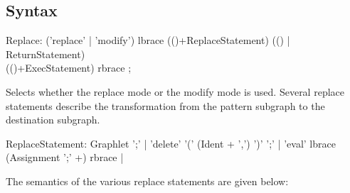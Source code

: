 \subsection{Syntax}

\begin{rail}
  Replace: ('replace' | 'modify') lbrace (()+ReplaceStatement) (() | ReturnStatement) \\
  (()+ExecStatement) rbrace ;
\end{rail}
Selects whether the replace mode or the modify mode is used. Several replace statements describe the transformation from the pattern subgraph to the destination subgraph.

\begin{rail}  
  ReplaceStatement: Graphlet ';' |
    'delete' '(' (Ident + ',') ')' ';' |
    'eval' lbrace (Assignment ';' +) rbrace |
\end{rail}
The semantics of the various replace statements are given below:
